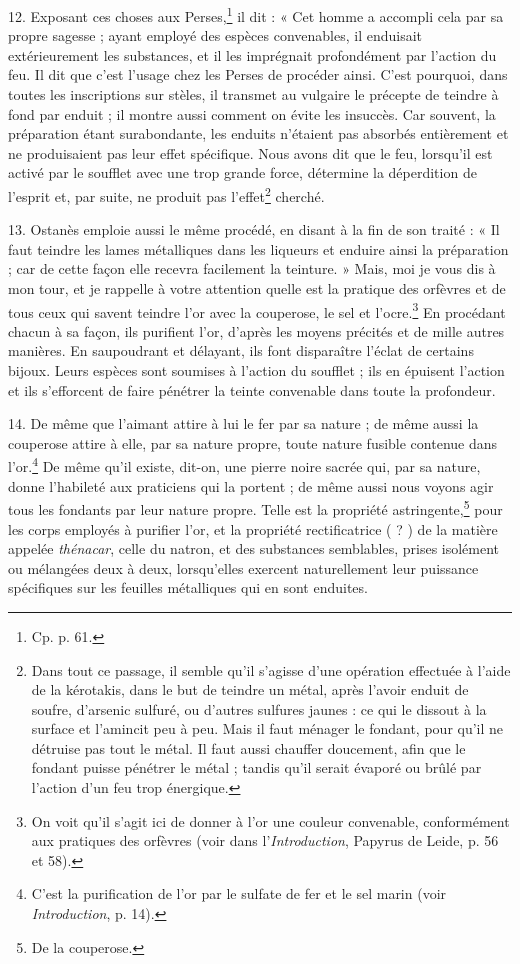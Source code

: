 \documentclass[a4paper, 11pt, oneside, polutonikogreek, french]{article}
\begin{document}
12. Exposant ces choses aux Perses,\footnote{Cp. p. 61.} il dit : « Cet homme a accompli cela par sa propre sagesse ; ayant employé des espèces convenables, il enduisait extérieurement les substances, et il les imprégnait profondément par l'action du feu. Il dit que c'est l'usage chez les Perses de procéder ainsi. C'est pourquoi, dans toutes les inscriptions sur stèles, il transmet au vulgaire le précepte de teindre à fond par enduit ; il montre aussi comment on évite les insuccès. Car souvent, la préparation étant surabondante, les enduits n'étaient pas absorbés entièrement et ne produisaient pas leur effet spécifique. Nous avons dit que le feu, lorsqu'il est activé par le soufflet avec une trop grande force, détermine la déperdition de l'esprit et, par suite, ne produit pas l'effet\footnote{Dans tout ce passage, il semble qu'il s'agisse d'une opération effectuée à l'aide de la kérotakis, dans le but de teindre un métal, après l'avoir enduit de soufre, d'arsenic sulfuré, ou d'autres sulfures jaunes : ce qui le dissout à la surface et l'amincit peu à peu. Mais il faut ménager le fondant, pour qu'il ne détruise pas tout le métal. Il faut aussi chauffer doucement, afin que le fondant puisse pénétrer le métal ; tandis qu'il serait évaporé ou brûlé par l'action d'un feu trop énergique.} cherché.

13. Ostanès emploie aussi le même procédé, en disant à la fin de son traité : « Il faut teindre les lames métalliques dans les liqueurs et enduire ainsi la préparation ; car de cette façon elle recevra facilement la teinture. » Mais, moi je vous dis à mon tour, et je rappelle à votre attention quelle est la pratique des orfèvres et de tous ceux qui savent teindre l'or avec la couperose, le sel et l'ocre.\footnote{On voit qu'il s'agit ici de donner à l'or une couleur convenable, conformément aux pratiques des orfèvres (voir dans l'\emph{Introduction}, Papyrus de Leide, p. 56 et 58).} En procédant chacun à sa façon, ils purifient l'or, d'après les moyens précités et de mille autres manières. En saupoudrant et délayant, ils font disparaître l'éclat de certains bijoux. Leurs espèces sont soumises à l'action du soufflet ; ils en épuisent l'action et ils s'efforcent de faire pénétrer la teinte convenable dans toute la profondeur.

14. De même que l'aimant attire à lui le fer par sa nature ; de même aussi la couperose attire à elle, par sa nature propre, toute nature fusible contenue dans l'or.\footnote{C'est la purification de l'or par le sulfate de fer et le sel marin (voir \emph{Introduction}, p. 14).} De même qu'il existe, dit-on, une pierre noire sacrée qui, par sa nature, donne l'habileté aux praticiens qui la portent ; de même aussi nous voyons agir tous les fondants par leur nature propre. Telle est la propriété astringente,\footnote{De la couperose.} pour les corps employés à purifier l'or, et la propriété rectificatrice ( ? ) de la matière appelée \emph{thénacar}, celle du natron, et des substances semblables, prises isolément ou mélangées deux à deux, lorsqu'elles exercent naturellement leur puissance spécifiques sur les feuilles métalliques qui en sont enduites.
\end{document}
